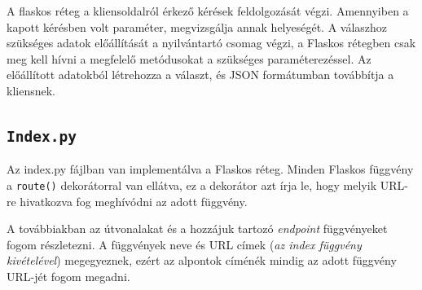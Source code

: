 A flaskos réteg a kliensoldalról érkező kérések feldolgozását végzi. Amennyiben a kapott kérésben volt paraméter, megvizsgálja annak helyeségét. A válaszhoz szükséges adatok előállítását a nyilvántartó csomag végzi, a Flaskos rétegben csak meg kell hívni a megfelelő metódusokat a szükséges paraméterezéssel. Az előállított adatokból létrehozza a választ, és JSON formátumban továbbítja a kliensnek.

\subsection{\texttt{Index.py}}

Az index.py fájlban van implementálva a Flaskos réteg. Minden Flaskos függvény a \texttt{route()} dekorátorral van ellátva, ez a dekorátor azt írja le, hogy melyik URL-re hivatkozva fog meghívódni az adott függvény.

A továbbiakban az útvonalakat és a hozzájuk tartozó \textit{endpoint} függvényeket fogom részletezni.
A függvények neve és URL címek (\textit{az index függvény kivételével}) megegyeznek, ezért az alpontok címénék mindig az adott függvény URL-jét fogom megadni.

